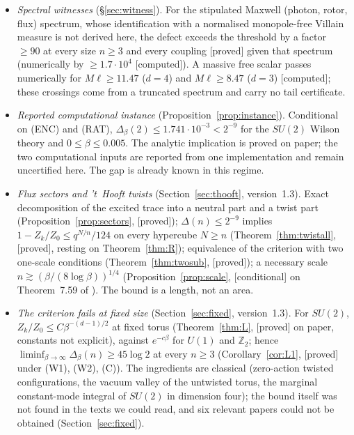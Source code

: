 \documentclass[11pt,a4paper]{article}
\theoremstyle{plain}
\theoremstyle{definition}
\theoremstyle{remark}
\numberwithin{equation}{section}
\newcommand{\Z}{\mathbb{Z}}
\newcommand{\st}[1]{\textsf{[#1]}}
\begin{document}
\begin{itemize}
(flux sectors included) and a trace bound give an explicit sufficient inequality for the criterion at a fixed physical size; eventual
smallness as $\ell\to\infty$ needs control of the dependence of the trace bound on $\ell$. Examples~\ref{ex:copies} and~\ref{ex:z2} show that
neither the finite-volume gap nor the trace bound can be dropped.
\item \emph{Spectral witnesses} (\S\ref{sec:witness}). For the stipulated Maxwell (photon, rotor, flux) spectrum, whose identification
with a normalised monopole-free Villain measure is not derived here, the defect exceeds the threshold by a factor $\ge90$ at every size $n\ge3$
and every coupling \st{proved} given that spectrum (numerically by $\ge1.7\cdot10^4$ \st{computed}). A massive free scalar passes numerically
for $M\ell\ge11.47$ ($d=4$) and $M\ell\ge8.47$ ($d=3$) \st{computed}; these crossings come from a truncated spectrum and carry no tail
certificate.
\item \emph{Reported computational instance} (Proposition~\ref{prop:instance}). Conditional on (ENC) and (RAT), $\Delta_\beta(2)\le1.741\cdot10^{-3}<2^{-9}$ for the $SU(2)$ Wilson theory and $0\le\beta\le0.005$. The analytic implication is proved on paper; the two computational inputs are reported from one implementation and remain uncertified here. The gap is already known in this regime.
\item \emph{Flux sectors and 't~Hooft twists} (Section~\ref{sec:thooft}, version~1.3). Exact decomposition of the excited trace into a neutral part and a twist part (Proposition~\ref{prop:sectors}, \st{proved}); $\Delta(n)\le2^{-9}$ implies $1-Z_k/Z_0\le q^{N/n}/124$ on every hypercube $N\ge n$ (Theorem~\ref{thm:twistall}, \st{proved}, resting on Theorem~\ref{thm:R}); equivalence of the criterion with two one-scale conditions (Theorem~\ref{thm:twosub}, \st{proved}); a necessary scale $n\gtrsim(\beta/(8\log\beta))^{1/4}$ (Proposition~\ref{prop:scale}, \st{conditional} on Theorem~7.59 of \cite{BB26v5}). The bound is a length, not an area.
\item \emph{The criterion fails at fixed size} (Section~\ref{sec:fixed}, version~1.3). For $SU(2)$, $Z_k/Z_0\le C\beta^{-(d-1)/2}$ at fixed torus (Theorem~\ref{thm:L}, \st{proved} on paper, constants not explicit), against $e^{-c\beta}$ for $U(1)$ and $\Z_2$; hence $\liminf_{\beta\to\infty}\Delta_\beta(n)\ge45\log2$ at every $n\ge3$ (Corollary~\ref{cor:L1}, \st{proved} under (W1), (W2), (C)). The ingredients are classical (zero-action twisted configurations, the vacuum valley of the untwisted torus, the marginal constant-mode integral of $SU(2)$ in dimension four); the bound itself was not found in the texts we could read, and six relevant papers could not be obtained (Section~\ref{sec:fixed}).
\end{itemize}
\end{document}
